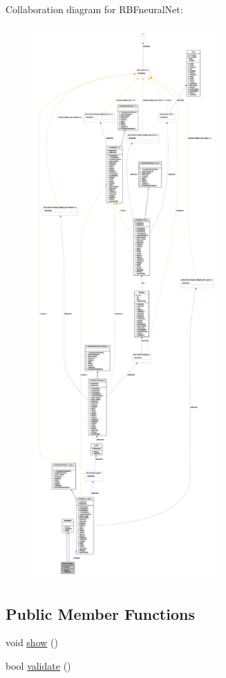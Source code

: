 Collaboration diagram for RBFneuralNet:
\nopagebreak
\begin{figure}[H]
\begin{center}
\leavevmode
\includegraphics[height=600pt]{class_r_b_fneural_net__coll__graph}
\end{center}
\end{figure}
\subsection*{Public Member Functions}
\begin{DoxyCompactItemize}
\item 
void \hyperlink{class_r_b_fneural_net_a89fac2cbf18f8dc2333923052ac684e9}{show} ()
\item 
bool \hyperlink{class_r_b_fneural_net_ad438aa29c655dac0b53246d13a88e591}{validate} ()
\end{DoxyCompactItemize}
